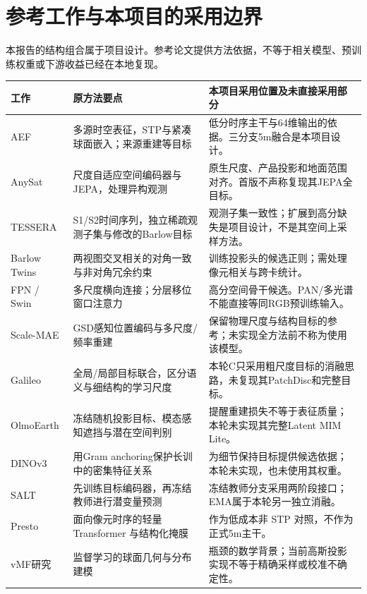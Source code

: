 \documentclass[UTF8,fontset=fandol,zihao=5,a4paper]{ctexart}
\newcommand{\reportpage}{\clearpage}
\begin{document}
\reportpage
\section{参考工作与本项目的采用边界}
本报告的结构组合属于项目设计。参考论文提供方法依据，不等于相关模型、预训练权重或下游收益已经在本地复现。

\noindent\begin{tabularx}{\linewidth}{@{}p{2.6cm}YY@{}}
\toprule 工作 & 原方法要点 & 本项目采用位置及未直接采用部分\\\midrule
AEF\cite{aef} & 多源时空表征，STP与紧凑球面嵌入；来源重建等目标 & 低分时序主干与64维输出的依据。三分支5m融合是本项目设计。\\
AnySat\cite{anysat} & 尺度自适应空间编码器与JEPA，处理异构观测 & 原生尺度、产品投影和地面范围对齐。首版不声称复现其JEPA全目标。\\
TESSERA\cite{tessera} & S1/S2时间序列，独立稀疏观测子集与修改的Barlow目标 & 观测子集一致性；扩展到高分缺失是项目设计，不是其空间上采样方法。\\
Barlow Twins\cite{barlow} & 两视图交叉相关的对角一致与非对角冗余约束 & 训练投影头的候选正则；需处理像元相关与跨卡统计。\\
FPN / Swin\cite{fpn,swin} & 多尺度横向连接；分层移位窗口注意力 & 高分空间骨干候选。PAN/多光谱不能直接等同RGB预训练输入。\\
Scale-MAE\cite{scalemae} & GSD感知位置编码与多尺度/频率重建 & 保留物理尺度与结构目标的参考；未实现全方法前不称为使用该模型。\\
Galileo\cite{galileo} & 全局/局部目标联合，区分语义与细结构的学习尺度 & 本轮C只采用粗尺度目标的消融思路，未复现其PatchDisc和完整目标。\\
OlmoEarth\cite{olmoearth} & 冻结随机投影目标、模态感知遮挡与潜在空间判别 & 提醒重建损失不等于表征质量；本轮未实现其完整Latent MIM Lite。\\
DINOv3\cite{dinov3} & 用Gram anchoring保护长训中的密集特征关系 & 为细节保持目标提供候选依据；本轮未实现，也未使用其权重。\\
SALT\cite{salt} & 先训练目标编码器，再冻结教师进行潜变量预测 & 冻结教师分支采用两阶段接口；EMA属于本轮另一独立消融。\\
Presto\cite{presto} & 面向像元时序的轻量 Transformer 与结构化掩膜 & 作为低成本非 STP 对照，不作为正式5m主干。\\
vMF研究\cite{vmf} & 监督学习的球面几何与分布建模 & 瓶颈的数学背景；当前高斯投影实现不等于精确采样或校准不确定性。\\\bottomrule
\end{tabularx}
\end{document}
